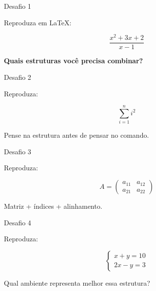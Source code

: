 \documentclass[aspectratio=169,xcolor=dvipsnames]{beamer}
\begin{document}
\begin{frame}{Desafio 1}

    Reproduza em LaTeX:

    \[
        \frac{x^2+3x+2}{x-1}
    \]

    \vspace{0.5cm}

    \begin{center}
        \textbf{Quais estruturas você precisa combinar?}
    \end{center}

\end{frame}

\begin{frame}{Desafio 2}

    Reproduza:

    \[
        \sum_{i=1}^{n}i^2
    \]

    \vspace{0.5cm}

    \begin{center}
        Pense na estrutura antes de pensar no comando.
    \end{center}

\end{frame}

\begin{frame}{Desafio 3}

    Reproduza:

    \[
        A=
        \begin{pmatrix}
            a_{11} & a_{12}\\
            a_{21} & a_{22}
        \end{pmatrix}
    \]

    \vspace{0.4cm}

    \begin{center}
        Matriz + índices + alinhamento.
    \end{center}

\end{frame}

\begin{frame}{Desafio 4}

    Reproduza:

    \[
        \begin{cases}
            x+y=10\\
            2x-y=3
        \end{cases}
    \]

    \vspace{0.4cm}

    \begin{center}
        Qual ambiente representa melhor essa estrutura?
    \end{center}

\end{frame}
\end{document}
